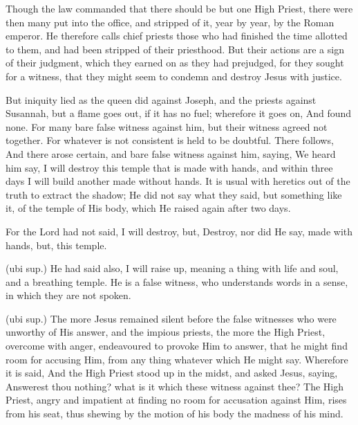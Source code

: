  Though the law commanded that there should be but one High Priest, there were then many put into the office, and stripped of it, year by year, by the Roman emperor. He therefore calls chief priests those who had finished the time allotted to them, and had been stripped of their priesthood. But their actions are a sign of their judgment, which they earned on as they had prejudged, for they sought for a witness, that they might seem to condemn and destroy Jesus with justice.

 But iniquity lied as the queen did against Joseph, and the priests against Susannah, but a flame goes out, if it has no fuel; wherefore it goes on, And found none. For many bare false witness against him, but their witness agreed not together. For whatever is not consistent is held to be doubtful. There follows, And there arose certain, and bare false witness against him, saying, We heard him say, I will destroy this temple that is made with hands, and within three days I will build another made without hands. It is usual with heretics out of the truth to extract the shadow; He did not say what they said, but something like it, of the temple of His body, which He raised again after two days.

 For the Lord had not said, I will destroy, but, Destroy, nor did He say, made with hands, but, this temple.

 (ubi sup.) He had said also, I will raise up, meaning a thing with life and soul, and a breathing temple. He is a false witness, who understands words in a sense, in which they are not spoken.

 

 (ubi sup.) The more Jesus remained silent before the false witnesses who were unworthy of His answer, and the impious priests, the more the High Priest, overcome with anger, endeavoured to provoke Him to answer, that he might find room for accusing Him, from any thing whatever which He might say. Wherefore it is said, And the High Priest stood up in the midst, and asked Jesus, saying, Answerest thou nothing? what is it which these witness against thee? The High Priest, angry and impatient at finding no room for accusation against Him, rises from his seat, thus shewing by the motion of his body the madness of his mind.

